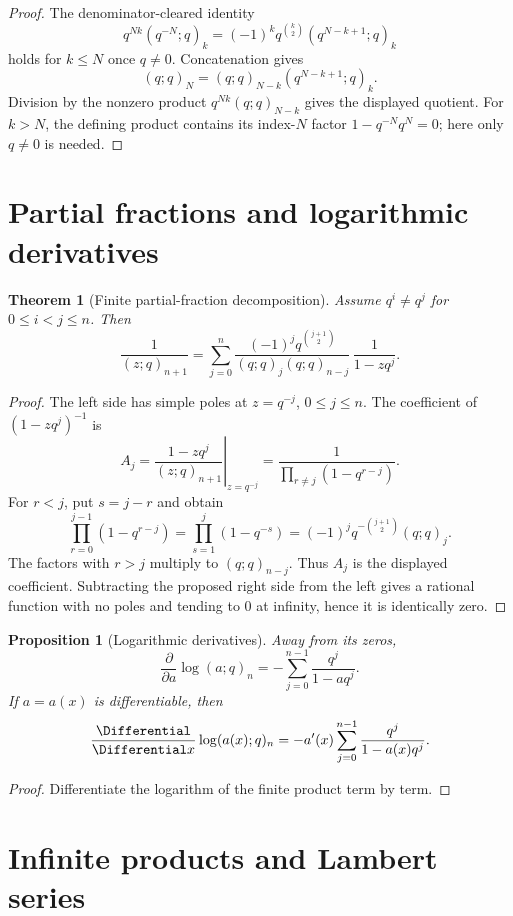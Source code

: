 \documentclass[11pt,a4paper,oneside,openany]{book}
\newtheorem{theorem}{Theorem}[chapter]
\newtheorem{proposition}[proposition]{Proposition}
\theoremstyle{definition}
\theoremstyle{remark}
\begin{document}
\begin{proof}
The denominator-cleared identity
\[
 q^{Nk}(q^{-N};q)_k
 =(-1)^kq^{\binom k2}(q^{N-k+1};q)_k
\]
holds for $k\le N$ once $q\ne0$.  Concatenation gives
\[
 (q;q)_N=(q;q)_{N-k}(q^{N-k+1};q)_k.
\]
Division by the nonzero product $q^{Nk}(q;q)_{N-k}$ gives the displayed
quotient.  For $k>N$, the defining product contains its index-$N$ factor
$1-q^{-N}q^N=0$; here only $q\ne0$ is needed.
\end{proof}

\section{Partial fractions and logarithmic derivatives}

\begin{theorem}[Finite partial-fraction decomposition]\label{thm:partial-fraction}
Assume $q^i\ne q^j$ for $0\le i<j\le n$.  Then
\[
 \frac{1}{(z;q)_{n+1}}
 =\sum_{j=0}^{n}
 \frac{(-1)^j q^{\binom{j+1}{2}}}
 {(q;q)_j(q;q)_{n-j}}\,
 \frac{1}{1-zq^j}.
\]
\end{theorem}

\begin{proof}
The left side has simple poles at $z=q^{-j}$, $0\le j\le n$.  The coefficient of $(1-zq^j)^{-1}$ is
\[
 A_j=\left.\frac{1-zq^j}{(z;q)_{n+1}}\right|_{z=q^{-j}}
 =\frac{1}{\prod_{r\ne j}(1-q^{r-j})}.
\]
For $r<j$, put $s=j-r$ and obtain
\[
 \prod_{r=0}^{j-1}(1-q^{r-j})
 =\prod_{s=1}^{j}(1-q^{-s})
 =(-1)^jq^{-\binom{j+1}{2}}(q;q)_j.
\]
The factors with $r>j$ multiply to $(q;q)_{n-j}$.  Thus $A_j$ is the displayed coefficient.  Subtracting the proposed right side from the left gives a rational function with no poles and tending to $0$ at infinity, hence it is identically zero.
\end{proof}

\begin{proposition}[Logarithmic derivatives]\label{prop:logder-finite}
Away from its zeros,
\[
 \frac{\partial}{\partial a}\log(a;q)_n
 =-\sum_{j=0}^{n-1}\frac{q^j}{1-aq^j}.
\]
If $a=a(x)$ is differentiable, then
\[
 \frac{\Differential}{\Differential x}\log(a(x);q)_n
 =-a'(x)\sum_{j=0}^{n-1}\frac{q^j}{1-a(x)q^j}.
\]
\end{proposition}

\begin{proof}
Differentiate the logarithm of the finite product term by term.
\end{proof}

\section{Infinite products and Lambert series}
\end{document}
